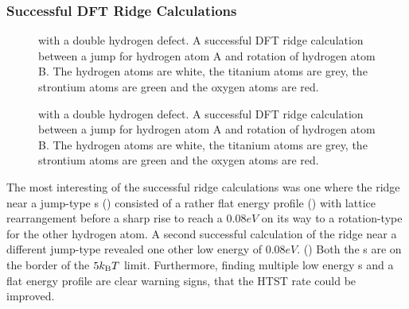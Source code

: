 \subsubsection{Successful DFT Ridge Calculations}
\begin{figure}[h]
\begin{center}
    \parbox{0.85\linewidth}{
      \caption{ with a double hydrogen defect.
A successful DFT ridge calculation between a jump  for hydrogen atom A and rotation of hydrogen atom B.
The hydrogen atoms are white, the titanium atoms are grey, the strontium atoms are green and the oxygen atoms are red.
      }
      \label{fig:semi-results}
    }
\end{center}
\end{figure}
\begin{figure}[h]
\begin{center}
    \parbox{0.85\linewidth}{
      \caption{ with a double hydrogen defect.
A successful DFT ridge calculation between a jump  for hydrogen atom A and rotation of hydrogen atom B.
The hydrogen atoms are white, the titanium atoms are grey, the strontium atoms are green and the oxygen atoms are red.
      }
      \label{fig:jump-results}
    }
\end{center}
\end{figure}
The most interesting of the successful ridge calculations was one where the ridge near a jump-type s () consisted of a rather flat energy profile () with lattice rearrangement before a sharp rise to reach a $0.08\unit{eV}$  on its way to a rotation-type  for the other hydrogen atom.
A second successful calculation of the ridge near a different jump-type  revealed one other low energy  of $0.08\unit{eV}$. ()
Both the s are on the border of the $5k_\text{B} T$ limit. 
Furthermore, finding multiple low energy s and a flat energy profile are clear warning signs, that the HTST rate could be improved.

